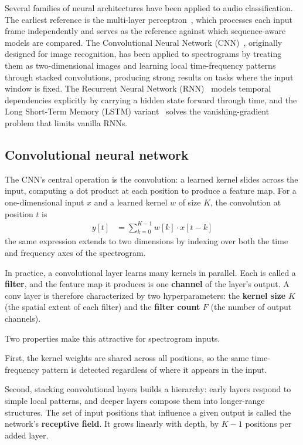 Several families of neural architectures have been applied to audio classification.
The earliest reference is the multi-layer perceptron~\cite{rumelhart1986backprop}, which processes each input frame independently and serves as the reference against which sequence-aware models are compared.
The Convolutional Neural Network (CNN)~\cite{lecun1998cnn}, originally designed for image recognition, has been applied to spectrograms by treating them as two-dimensional images and learning local time-frequency patterns through stacked convolutions, producing strong results on tasks where the input window is fixed.
The Recurrent Neural Network (RNN)~\cite{elman1990rnn} models temporal dependencies explicitly by carrying a hidden state forward through time, and the Long Short-Term Memory (LSTM) variant~\cite{hochreiter1997lstm} solves the vanishing-gradient problem that limits vanilla RNNs.

\subsection{Convolutional neural network}
The CNN's central operation is the convolution: a learned kernel slides across the input, computing a dot product at each position to produce a feature map.
For a one-dimensional input $x$ and a learned kernel $w$ of size $K$, the convolution at position $t$ is
\begin{align}
\label{eq:conv_1d}
y[t] &= \sum_{k=0}^{K-1} w[k] \cdot x[t-k]
\end{align}
the same expression extends to two dimensions by indexing over both the time and frequency axes of the spectrogram.

In practice, a convolutional layer learns many kernels in parallel.
Each is called a \textbf{filter}, and the feature map it produces is one \textbf{channel} of the layer's output.
A conv layer is therefore characterized by two hyperparameters: the \textbf{kernel size} $K$ (the spatial extent of each filter) and the \textbf{filter count} $F$ (the number of output channels).

Two properties make this attractive for spectrogram inputs.

First, the kernel weights are shared across all positions, so the same time-frequency pattern is detected regardless of where it appears in the input.

Second, stacking convolutional layers builds a hierarchy: early layers respond to simple local patterns, and deeper layers compose them into longer-range structures.
The set of input positions that influence a given output is called the network's \textbf{receptive field}.
It grows linearly with depth, by $K-1$ positions per added layer.

